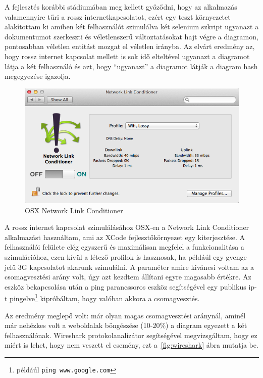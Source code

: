 A fejlesztés korábbi stádiumában meg kellett győződni, hogy az alkalmazás valamennyire tűri a rossz internetkapcsolatot, ezért egy teszt környezetet alakítottam ki amiben két felhasználót szimulálva két selenium szkript ugyanazt a dokumentumot szerkeszti és véletlenszerű változtatásokat hajt végre a diagramon, pontosabban véletlen entitást mozgat el véletlen irányba. Az elvárt eredmény az, hogy rossz internet kapcsolat mellett is sok idő elteltével ugyanazt a diagramot látja a két felhasználó és azt, hogy ``ugyanazt'' a diagramot látják a diagram hash megegyezése igazolja.
 

\begin{figure}[!ht]
\centering
\includegraphics[width=15cm,keepaspectratio]{figures/nlc.png}
\caption{OSX Network Link Conditioner}
\label{fig:nlc}
\end{figure}


A rossz internet kapcsolat szimulálásához OSX-en a Network Link Conditioner alkalmazást használtam, ami az XCode fejlesztőkörnyezet egy kiterjesztése. A felhasználói felülete elég egyszerű és maximálisan megfelel a funkcionalitása a szimulációhoz, ezen kívül a létező profilok is hasznosak, ha példáúl egy gyenge jelű 3G kapcsolatot akarunk szimulálni. A paraméter amire kiváncsi voltam az a csomagvesztési arány volt, úgy azt kezdtem állítani egyre magasabb értékre. Az eszköz bekapcsolása után a ping parancssoros eszköz segítségével egy publikus ip-t pingelve\footnote{példáúl \lstinline{ping www.google.com}} kipróbáltam, hogy valóban akkora a csomagvesztés.

Az eredmény meglepő volt: már olyan magas csomagvesztési aránynál, aminél már nehézkes volt a weboldalak böngészése (10-20\%) a diagram egyezett a két felhasználónak. Wireshark protokolanalizátor segítségével megvizsgáltam, hogy ez miért is lehet, hogy nem veszett el esemény, ezt a~\ref{fig:wireshark} ábra mutatja be.


